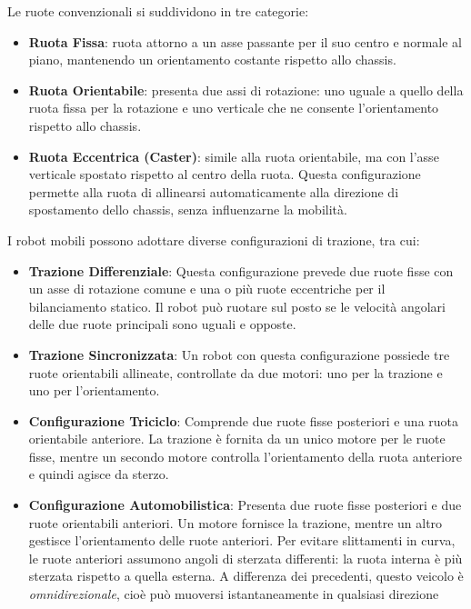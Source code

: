 ﻿\documentclass[11pt, a4paper]{article}
\begin{document}
Le ruote convenzionali si suddividono in tre categorie:
\begin{itemize}
    \item \textbf{Ruota Fissa}: ruota attorno a un asse passante per il suo centro e normale al piano, mantenendo un orientamento costante rispetto allo chassis.

    \item \textbf{Ruota Orientabile}: presenta due assi di rotazione: uno uguale a quello della ruota fissa per la rotazione e uno verticale che ne consente l'orientamento rispetto allo chassis.

    \item \textbf{Ruota Eccentrica (Caster)}: simile alla ruota orientabile, ma con l'asse verticale spostato rispetto al centro della ruota. Questa configurazione permette alla ruota di allinearsi automaticamente alla direzione di spostamento dello chassis, senza influenzarne la mobilità.
\end{itemize}

I robot mobili possono adottare diverse configurazioni di trazione, tra cui:
\begin{itemize}
    \item \textbf{Trazione Differenziale}: Questa configurazione prevede due ruote fisse con un asse di rotazione comune e una o più ruote eccentriche per il bilanciamento statico. Il robot può ruotare sul posto se le velocità angolari delle due ruote principali sono uguali e opposte.

    \item \textbf{Trazione Sincronizzata}: Un robot con questa configurazione possiede tre ruote orientabili allineate, controllate da due motori: uno per la trazione e uno per l'orientamento.

    \item \textbf{Configurazione Triciclo}: Comprende due ruote fisse posteriori e una ruota orientabile anteriore. La trazione è fornita da un unico motore per le ruote fisse, mentre un secondo motore controlla l'orientamento della ruota anteriore e quindi agisce da sterzo.

    \item \textbf{Configurazione Automobilistica}: Presenta due ruote fisse posteriori e due ruote orientabili anteriori. Un motore fornisce la trazione, mentre un altro gestisce l'orientamento delle ruote anteriori. Per evitare slittamenti in curva, le ruote anteriori assumono angoli di sterzata differenti: la ruota interna è più sterzata rispetto a quella esterna. A differenza dei precedenti, questo veicolo è \textit{omnidirezionale}, cioè può muoversi istantaneamente in qualsiasi direzione
\end{itemize}
\end{document}
